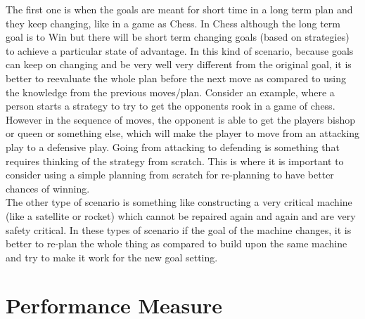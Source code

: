 \documentclass[a4paper]{article}
\begin{document}
The first one is when the goals are meant for short time in a long term plan and they keep changing, like in a game as Chess. In Chess although the long term goal is to Win but there will be short term changing goals (based on strategies) to achieve a particular state of advantage. In this kind of scenario, because goals can keep on changing and be very well very different from the original goal, it is better to reevaluate the whole plan before the next move as compared to using the knowledge from the previous moves/plan. Consider an example, where  a person starts a strategy to try to get the opponents rook in a game of chess. However in the sequence of moves, the opponent is able to get the players bishop or queen or something else, which will make the player to move from an attacking play to a defensive play. Going from attacking to defending is something that requires thinking of the strategy from scratch. This is where it is important to consider using a simple planning from scratch for re-planning to have better chances of winning.
\\

The other type of scenario is something like constructing a very critical machine (like a satellite or rocket) which cannot be repaired again and again and are very safety critical. In these types of scenario if the goal of the machine changes, it is better to re-plan the whole thing as compared to build upon the same machine and try to make it work for the new goal setting.
\\

\section{Performance Measure}
\label{sec:Q3}
\end{document}
